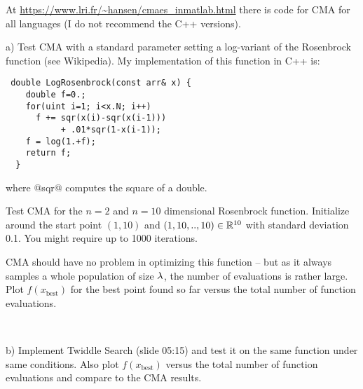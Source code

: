 

\renewcommand{\course}{Optimization}
\renewcommand{\coursepicture}{optim}
\renewcommand{\coursedate}{Summer 2015}
\renewcommand{\exnum}{7}

\exercises



At \url{https://www.lri.fr/~hansen/cmaes_inmatlab.html} there is code
for CMA for all languages (I do not recommend the C++ versions).

a) Test CMA with a standard parameter setting a log-variant of the Rosenbrock
  function (see Wikipedia). My implementation of this function in C++ is:\\
\begin{code}
\begin{verbatim}
 double LogRosenbrock(const arr& x) {
    double f=0.;
    for(uint i=1; i<x.N; i++)
      f += sqr(x(i)-sqr(x(i-1)))
           + .01*sqr(1-x(i-1));
    f = log(1.+f);
    return f;
  }
\end{verbatim}
\end{code}
where @sqr@ computes the square of a double.

Test CMA for the $n=2$ and $n=10$ dimensional Rosenbrock
function. Initialize around the start point $(1,10)$ and $(1,10,..,10)\in{\mathbb{R}}^{10}$
with standard deviation 0.1. You might require up to 1000 iterations.

CMA should have no problem in optimizing this function -- but as it
always samples a whole population of size $\lambda$, the number of
evaluations is rather large. Plot $f(x_{\text{best}})$ for the best
point found so far versus the total number of function evaluations.

~

b) Implement Twiddle Search (slide 05:15) and test it on the same
function under same conditions. Also plot $f(x_{\text{best}})$ versus
the total number of function evaluations and compare to the CMA results.



\exerfoot

